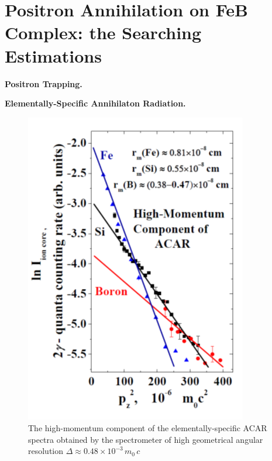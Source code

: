 \documentclass{ttp}
\begin{document}
\section{Positron Annihilation on FeB Complex: the Searching Estimations}


\noindent \textbf{Positron Trapping.}

\noindent \textbf{Elementally-Specific Annihilaton Radiation.}


\begin{figure}
	\centering
     \includegraphics[width=\linewidth]{Fig6.png}
	  \caption{The high-momentum component of the elementally-specific ACAR spectra
        obtained by the spectrometer of high geometrical angular resolution $\Delta \approx 0.48 \times 10^{-3}\,m_0\,c$
}
\end{figure}
\end{document}
